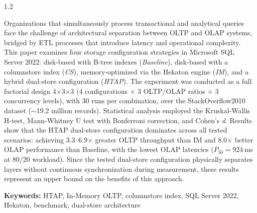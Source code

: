 \begin{spacing}{1.2}
{Organizations that simultaneously process transactional and analytical queries face the challenge of architectural separation between OLTP and OLAP systems, bridged by ETL processes that introduce latency and operational complexity. This paper examines four storage configuration strategies in Microsoft SQL Server 2022: disk-based with B-tree indexes (\textit{Baseline}), disk-based with a columnstore index (\textit{CS}), memory-optimized via the Hekaton engine (\textit{IM}), and a hybrid dual-store configuration (\textit{HTAP}). The experiment was conducted as a full factorial design 4$\times$3$\times$3 (4 configurations $\times$ 3 OLTP/OLAP ratios $\times$ 3 concurrency levels), with 30 runs per combination, over the StackOverflow2010 dataset ($\sim$19.2 million records). Statistical analysis employed the Kruskal-Wallis H-test, Mann-Whitney U test with Bonferroni correction, and Cohen's \textit{d}. Results show that the HTAP dual-store configuration dominates across all tested scenarios: achieving 3.3--6.9$\times$ greater OLTP throughput than IM and 8.0$\times$ better OLAP performance than Baseline, with the lowest OLAP latencies ($P_{50}=924$\,ms at 80/20 workload). Since the tested dual-store configuration physically separates layers without continuous synchronization during measurement, these results represent an upper bound on the benefits of this approach.

\vspace{0.2cm}
\noindent\textbf{Keywords:} HTAP, In-Memory OLTP, columnstore index, SQL Server 2022, Hekaton, benchmark, dual-store architecture
}
\end{spacing}
